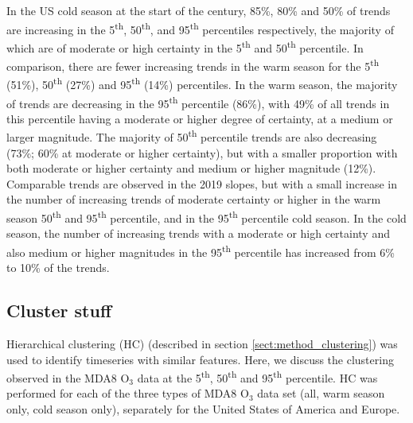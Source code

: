 \documentclass[journal abbreviation, manuscript]{copernicus}
\begin{document}
In the US cold season at the start of the century, 85\%, 80\% and 50\% of trends are increasing in the 5\textsuperscript{th}, 50\textsuperscript{th}, and 95\textsuperscript{th} percentiles respectively, the majority of which are of moderate or high certainty in the 5\textsuperscript{th} and 50\textsuperscript{th} percentile. In comparison, there are fewer increasing trends in the warm season for the 5\textsuperscript{th} (51\%), 50\textsuperscript{th} (27\%) and 95\textsuperscript{th} (14\%) percentiles. In the warm season, the majority of trends are decreasing in the 95\textsuperscript{th} percentile (86\%), with 49\% of all trends in this percentile having a moderate or higher degree of certainty, at a medium or larger magnitude. The majority of 50\textsuperscript{th} percentile trends are also decreasing (73\%; 60\% at moderate or higher certainty), but with a smaller proportion with both moderate or higher certainty and medium or higher magnitude (12\%). Comparable trends are observed in the 2019 slopes, but with a small increase in the number of increasing trends of moderate certainty or higher in the warm season 50\textsuperscript{th} and 95\textsuperscript{th} percentile, and in the 95\textsuperscript{th} percentile cold season. In the cold season, the number of increasing trends with a moderate or high certainty and also medium or higher magnitudes in the 95\textsuperscript{th} percentile has increased from 6\% to 10\% of the trends.


\subsection{Cluster stuff} \label{sect:cluster_stuff}
Hierarchical clustering (HC) (described in section \ref{sect:method_clustering}) was used to identify timeseries with similar features. Here, we discuss the clustering observed in the MDA8 O$_3$ data at the 5\textsuperscript{th}, 50\textsuperscript{th} and 95\textsuperscript{th} percentile. HC was performed for each of the three types of MDA8 O$_3$ data set (all, warm season only, cold season only), separately for the United States of America and Europe. 
\end{document}

